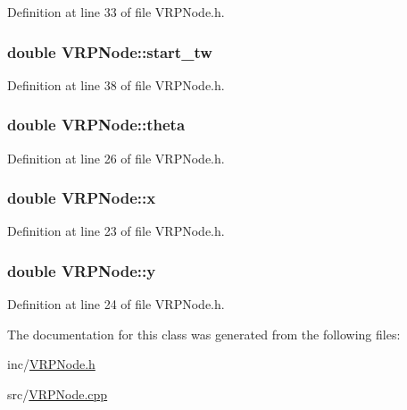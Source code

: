 Definition at line 33 of file VRPNode.h.

\hypertarget{class_v_r_p_node_aa04306e567bc57da1a4d2002ab27af77}{
\subsubsection[{start\_\-tw}]{\setlength{\rightskip}{0pt plus 5cm}double {\bf VRPNode::start\_\-tw}}}
\label{class_v_r_p_node_aa04306e567bc57da1a4d2002ab27af77}


Definition at line 38 of file VRPNode.h.

\hypertarget{class_v_r_p_node_a67007952897382052c524555c04ad57a}{
\subsubsection[{theta}]{\setlength{\rightskip}{0pt plus 5cm}double {\bf VRPNode::theta}}}
\label{class_v_r_p_node_a67007952897382052c524555c04ad57a}


Definition at line 26 of file VRPNode.h.

\hypertarget{class_v_r_p_node_a7a6f7729d65b17532ba940c0f5ac9d84}{
\subsubsection[{x}]{\setlength{\rightskip}{0pt plus 5cm}double {\bf VRPNode::x}}}
\label{class_v_r_p_node_a7a6f7729d65b17532ba940c0f5ac9d84}


Definition at line 23 of file VRPNode.h.

\hypertarget{class_v_r_p_node_ab3a03e6bbe9fb324759428fa457b38dd}{
\subsubsection[{y}]{\setlength{\rightskip}{0pt plus 5cm}double {\bf VRPNode::y}}}
\label{class_v_r_p_node_ab3a03e6bbe9fb324759428fa457b38dd}


Definition at line 24 of file VRPNode.h.



The documentation for this class was generated from the following files:\begin{DoxyCompactItemize}
\item 
inc/\hyperlink{_v_r_p_node_8h}{VRPNode.h}\item 
src/\hyperlink{_v_r_p_node_8cpp}{VRPNode.cpp}\end{DoxyCompactItemize}
